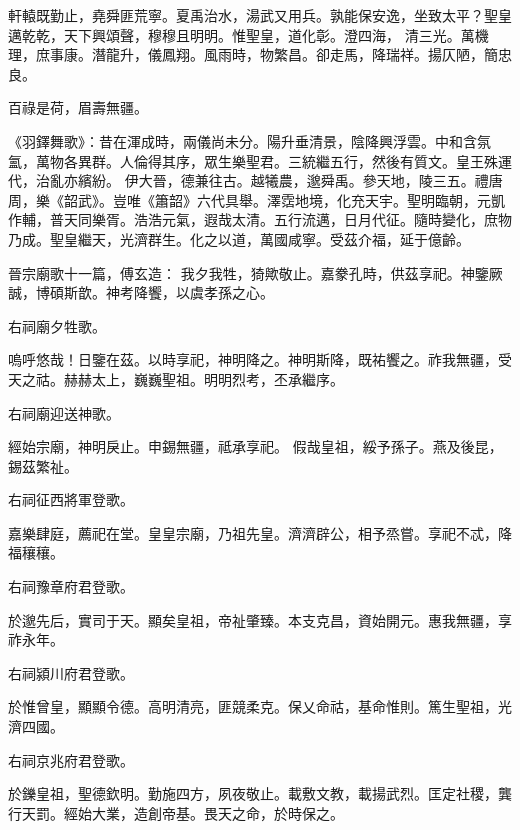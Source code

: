 \begin{pinyinscope}
 軒轅既勤止，堯舜匪荒寧。夏禹治水，湯武又用兵。孰能保安逸，坐致太平？聖皇邁乾乾，天下興頌聲，穆穆且明明。惟聖皇，道化彰。澄四海，
 清三光。萬機理，庶事康。潛龍升，儀鳳翔。風雨時，物繁昌。卻走馬，降瑞祥。揚仄陋，簡忠良。



 百祿是荷，眉壽無疆。



 《羽鐸舞歌》：昔在渾成時，兩儀尚未分。陽升垂清景，陰降興浮雲。中和含氛氳，萬物各異群。人倫得其序，眾生樂聖君。三統繼五行，然後有質文。皇王殊運代，治亂亦繽紛。
 伊大晉，德兼往古。越犧農，邈舜禹。參天地，陵三五。禮唐周，樂《韶武》。豈唯《簫韶》六代具舉。澤霑地境，化充天宇。聖明臨朝，元凱作輔，普天同樂胥。浩浩元氣，遐哉太清。五行流邁，日月代征。隨時變化，庶物乃成。聖皇繼天，光濟群生。化之以道，萬國咸寧。受茲介福，延于億齡。



 晉宗廟歌十一篇，傅玄造：
 我夕我牲，猗歟敬止。嘉豢孔時，供茲享祀。神鑒厥誠，博碩斯歆。神考降饗，以虞孝孫之心。



 右祠廟夕牲歌。



 嗚呼悠哉！日鑒在茲。以時享祀，神明降之。神明斯降，既祐饗之。祚我無疆，受天之祜。赫赫太上，巍巍聖祖。明明烈考，丕承繼序。



 右祠廟迎送神歌。



 經始宗廟，神明戾止。申錫無疆，祗承享祀。
 假哉皇祖，綏予孫子。燕及後昆，錫茲繁祉。



 右祠征西將軍登歌。



 嘉樂肆庭，薦祀在堂。皇皇宗廟，乃祖先皇。濟濟辟公，相予烝嘗。享祀不忒，降福穰穰。



 右祠豫章府君登歌。



 於邈先后，實司于天。顯矣皇祖，帝祉肇臻。本支克昌，資始開元。惠我無疆，享祚永年。



 右祠潁川府君登歌。



 於惟曾皇，顯顯令德。高明清亮，匪競柔克。保乂命祜，基命惟則。篤生聖祖，光濟四國。



 右祠京兆府君登歌。



 於鑠皇祖，聖德欽明。勤施四方，夙夜敬止。載敷文教，載揚武烈。匡定社稷，龔行天罰。經始大業，造創帝基。畏天之命，於時保之。




\end{pinyinscope}
